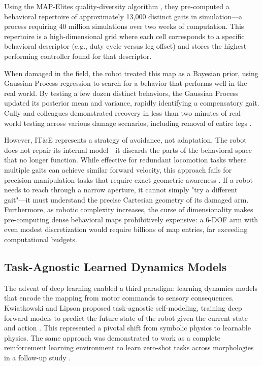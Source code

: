 \documentclass[12pt,a4paper,oneside]{report}
\begin{document}
Using the MAP-Elites quality-diversity algorithm \cite{mouret2015illuminating}, they pre-computed a behavioral repertoire of approximately 13,000 distinct gaits in simulation—a process requiring 40 million simulations over two weeks of computation. This repertoire is a high-dimensional grid where each cell corresponds to a specific behavioral descriptor (e.g., duty cycle versus leg offset) and stores the highest-performing controller found for that descriptor.

When damaged in the field, the robot treated this map as a Bayesian prior, using Gaussian Process regression to search for a behavior that performs well in the real world. By testing a few dozen distinct behaviors, the Gaussian Process updated its posterior mean and variance, rapidly identifying a compensatory gait. Cully and colleagues demonstrated recovery in less than two minutes of real-world testing across various damage scenarios, including removal of entire legs \cite{cully2015robots}.

However, IT\&E represents a strategy of avoidance, not adaptation. The robot does not repair its internal model—it discards the parts of the behavioral space that no longer function. While effective for redundant locomotion tasks where multiple gaits can achieve similar forward velocity, this approach fails for precision manipulation tasks that require exact geometric awareness \cite{kwiatkowski2019task}. If a robot needs to reach through a narrow aperture, it cannot simply "try a different gait"—it must understand the precise Cartesian geometry of its damaged arm. Furthermore, as robotic complexity increases, the curse of dimensionality makes pre-computing dense behavioral maps prohibitively expensive: a 6-DOF arm with even modest discretization would require billions of map entries, far exceeding computational budgets.

\subsection{Task-Agnostic Learned Dynamics Models}
\label{subsec:task_agnostic_models}

The advent of deep learning enabled a third paradigm: learning dynamics models that encode the mapping from motor commands to sensory consequences. Kwiatkowski and Lipson proposed task-agnostic self-modeling, training deep forward models to predict the future state of the robot given the current state and action \cite{kwiatkowski2019task}. This represented a pivotal shift from symbolic physics to learnable physics. The same approach was demonstrated to work as a complete reinforcement learning environment to learn zero-shot tasks across morphologies in a follow-up study \cite{kwiatkowski2019zeroshot}.
\end{document}
